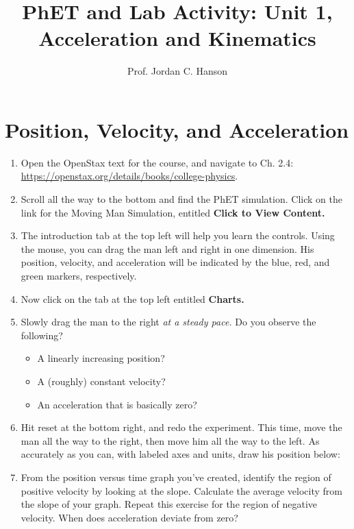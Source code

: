 \documentclass{article}
\begin{document}
\title{PhET and Lab Activity: Unit 1, Acceleration and Kinematics}
\author{Prof. Jordan C. Hanson}

\maketitle

\section{Position, Velocity, and Acceleration}

\begin{enumerate}
\item Open the OpenStax text for the course, and navigate to Ch. 2.4: \url{https://openstax.org/details/books/college-physics}.
\item Scroll all the way to the bottom and find the PhET simulation.  Click on the link for the Moving Man Simulation, entitled \textbf{Click to View Content.}
\item The introduction tab at the top left will help you learn the controls.  Using the mouse, you can drag the man left and right in one dimension.  His position, velocity, and acceleration will be indicated by the blue, red, and green markers, respectively.
\item Now click on the tab at the top left entitled \textbf{Charts.}
\item Slowly drag the man to the right \textit{at a steady pace.}  Do you observe the following?
\begin{itemize}
\item A linearly increasing position?
\item A (roughly) constant velocity?
\item An acceleration that is basically zero?
\end{itemize}
\item Hit reset at the bottom right, and redo the experiment.  This time, move the man all the way to the right, then move him all the way to the left.  As accurately as you can, with labeled axes and units, draw his position below: \\ \vspace{2.0cm}
\item From the position versus time graph you've created, identify the region of positive velocity by looking at the slope.  Calculate the average velocity from the slope of your graph.  Repeat this exercise for the region of negative velocity.  When does acceleration deviate from zero?
\end{enumerate}
\end{document}
